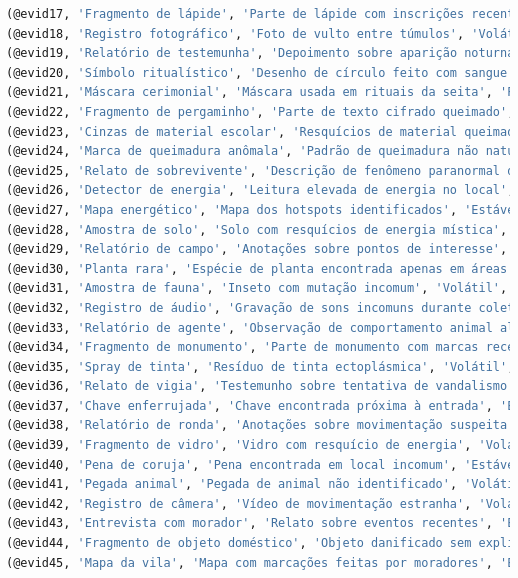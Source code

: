 \documentclass[12pt,a4paper]{report}
\begin{document}
\begin{lstlisting}[language=SQL, caption=population.sql]
(@evid17, 'Fragmento de lápide', 'Parte de lápide com inscrições recentes', 'Estável', @miss1),
(@evid18, 'Registro fotográfico', 'Foto de vulto entre túmulos', 'Volátil', @miss1),
(@evid19, 'Relatório de testemunha', 'Depoimento sobre aparição noturna', 'Estável', @miss1),
(@evid20, 'Símbolo ritualístico', 'Desenho de círculo feito com sangue', 'Perigoso', @miss2),
(@evid21, 'Máscara cerimonial', 'Máscara usada em rituais da seita', 'Perigoso', @miss2),
(@evid22, 'Fragmento de pergaminho', 'Parte de texto cifrado queimado', 'Volátil', @miss2),
(@evid23, 'Cinzas de material escolar', 'Resquícios de material queimado', 'Estável', @miss3),
(@evid24, 'Marca de queimadura anômala', 'Padrão de queimadura não natural', 'Volátil', @miss3),
(@evid25, 'Relato de sobrevivente', 'Descrição de fenômeno paranormal durante incêndio', 'Estável', @miss3),
(@evid26, 'Detector de energia', 'Leitura elevada de energia no local', 'Volátil', @miss3),
(@evid27, 'Mapa energético', 'Mapa dos hotspots identificados', 'Estável', @miss4),
(@evid28, 'Amostra de solo', 'Solo com resquícios de energia mística', 'Volátil', @miss4),
(@evid29, 'Relatório de campo', 'Anotações sobre pontos de interesse', 'Estável', @miss4),
(@evid30, 'Planta rara', 'Espécie de planta encontrada apenas em áreas energizadas', 'Estável', @miss4),
(@evid31, 'Amostra de fauna', 'Inseto com mutação incomum', 'Volátil', @miss5),
(@evid32, 'Registro de áudio', 'Gravação de sons incomuns durante coleta', 'Volátil', @miss5),
(@evid33, 'Relatório de agente', 'Observação de comportamento animal alterado', 'Estável', @miss5),
(@evid34, 'Fragmento de monumento', 'Parte de monumento com marcas recentes', 'Estável', @miss6),
(@evid35, 'Spray de tinta', 'Resíduo de tinta ectoplásmica', 'Volátil', @miss6),
(@evid36, 'Relato de vigia', 'Testemunho sobre tentativa de vandalismo', 'Estável', @miss6),
(@evid37, 'Chave enferrujada', 'Chave encontrada próxima à entrada', 'Estável', @miss7),
(@evid38, 'Relatório de ronda', 'Anotações sobre movimentação suspeita', 'Estável', @miss7),
(@evid39, 'Fragmento de vidro', 'Vidro com resquício de energia', 'Volátil', @miss7),
(@evid40, 'Pena de coruja', 'Pena encontrada em local incomum', 'Estável', @miss8),
(@evid41, 'Pegada animal', 'Pegada de animal não identificado', 'Volátil', @miss8),
(@evid42, 'Registro de câmera', 'Vídeo de movimentação estranha', 'Volátil', @miss8),
(@evid43, 'Entrevista com morador', 'Relato sobre eventos recentes', 'Estável', @miss9),
(@evid44, 'Fragmento de objeto doméstico', 'Objeto danificado sem explicação', 'Volátil', @miss9),
(@evid45, 'Mapa da vila', 'Mapa com marcações feitas por moradores', 'Estável', @miss9),

\end{lstlisting}
\end{document}
